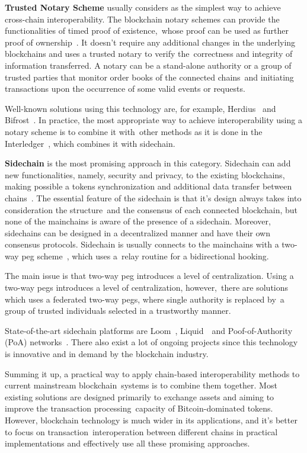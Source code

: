 \textbf{Trusted Notary Scheme} usually considers as the simplest way to achieve cross-chain interoperability.
The blockchain notary schemes can provide the functionalities of timed proof of existence,\
whose proof can be used as further proof of ownership~\cite{DIFRANCESCOMAESA202099}.
It doesn't require any additional changes in the underlying blockchains and uses a trusted notary to verify the\
correctness and integrity of information transferred.
A notary can be a stand-alone authority or a group of trusted parties that monitor order books of the connected chains\
and initiating transactions upon the occurrence of some valid events or requests.

Well-known solutions using this technology are, for example, Herdius~\cite{Balazs2017} and Bifrost~\cite{Scheid2019}.
In practice, the most appropriate way to achieve interoperability using a notary scheme is to combine it with\
other methods as it is done in the Interledger~\cite{Thomas2015}, which combines it with sidechain.

\textbf{Sidechain} is the most promising approach in this category.
Sidechain can add new functionalities, namely, security and privacy, to the existing blockchains,
making possible a tokens synchronization and additional data transfer between chains~\cite{Parizi2019}.
The essential feature of the sidechain is that it's design always takes into consideration the structure\
and the consensus of each connected blockchain, but none of the mainchains is aware of the presence of a sidechain.
Moreover, sidechains can be designed in a decentralized manner and have their own consensus protocols.
Sidechain is usually connects to the mainchains with a two-way peg scheme~\cite{SINGH2020102471}, which uses a\
relay routine for a bidirectional hooking.

The main issue is that two-way peg introduces a level of centralization.
Using a two-way pegs introduces a level of centralization, however,\
there are solutions which uses a federated two-way pegs, where single authority is replaced by\
a group of trusted individuals selected in a trustworthy manner.

State-of-the-art sidechain platforms are Loom~\cite{Loom2019}, Liquid~\cite{Nick2020LiquidAB}\
and Poof-of-Authority (PoA) networks~\cite{POA2018}.
There also exist a lot of ongoing projects since this technology is innovative and in demand by the blockchain industry.

Summing it up, a practical way to apply chain-based interoperability methods to current mainstream blockchain\
systems is to combine them together.
Most existing solutions are designed primarily to exchange assets and aiming to improve the transaction processing\
capacity of Bitcoin-dominated tokens.
However, blockchain technology is much wider in its applications, and it's better to focus on transaction\
interoperation between different chains in practical implementations and effectively use all these promising approaches.


